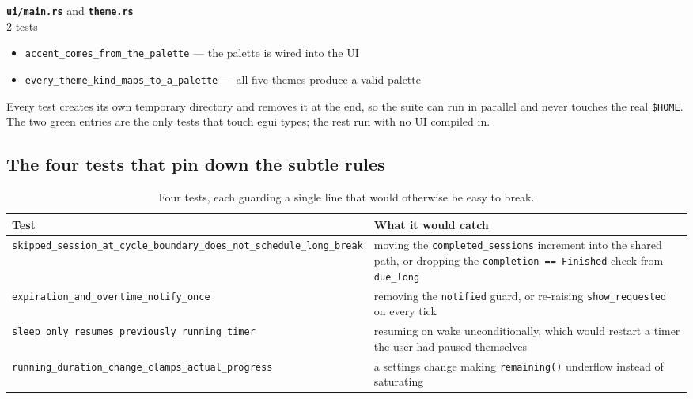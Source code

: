 \noindent\textbf{\textcolor{mint!60!black}{\texttt{ui/main.rs}}} and \textbf{\textcolor{mint!60!black}{\texttt{theme.rs}}}\\[0.4em]
\hspace{1.4em}2 tests\par
\begin{itemize}[leftmargin=1.4em,itemsep=0.15em,topsep=0.1em]
\item \texttt{accent\_comes\_\allowbreak from\_the\_palette} --- the palette is wired into the UI
\item \texttt{every\_theme\_kind\_\allowbreak maps\_to\_a\_palette} --- all five themes produce a valid palette
\end{itemize}

Every test creates its own temporary directory and removes it at the end, so the suite
can run in parallel and never touches the real \texttt{\$HOME}. The two green entries
are the only tests that touch egui types; the rest run with no UI compiled in.

\subsection{The four tests that pin down the subtle rules}

\begin{table}[H]
\centering\small
\begin{tabular}{@{}p{52mm} p{88mm}@{}}
\toprule
\textbf{Test} & \textbf{What it would catch} \\
\midrule
\texttt{skipped\_session\_at\_cycle\_\allowbreak boundary\_\allowbreak does\_not\_\allowbreak schedule\_\allowbreak long\_break} & moving the \texttt{completed\_sessions} increment into the shared path, or dropping the \texttt{completion == Finished} check from \texttt{due\_long} \\
\texttt{expiration\_and\_\allowbreak overtime\_notify\_once} & removing the \texttt{notified} guard, or re-raising \texttt{show\_requested} on every tick \\
\texttt{sleep\_only\_\allowbreak resumes\_\allowbreak previously\_\allowbreak running\_\allowbreak timer} & resuming on wake unconditionally, which would restart a timer the user had paused themselves \\
\texttt{running\_duration\_change\_\allowbreak clamps\_actual\_progress} & a settings change making \texttt{remaining()} underflow instead of saturating \\
\bottomrule
\end{tabular}
\caption{Four tests, each guarding a single line that would otherwise be easy to break.}
\end{table}

